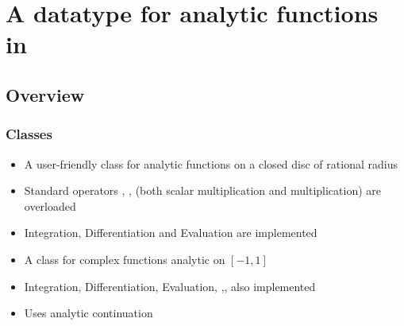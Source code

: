 \section[{Analytic functions in \irram}]{A datatype for analytic functions in \irram}
\subsection{Overview}
\begin{frame}[<+->]
\frametitle{Classes}
\begin{itemize}
\item A user-friendly class for analytic functions on a closed disc of rational radius
\item Standard operators \code{+}, \code{-}, \code{*} (both scalar multiplication and multiplication) are overloaded
\item Integration, Differentiation and Evaluation are implemented
\end{itemize}
\pause
{}
\begin{itemize}
\item A class for complex functions analytic on $[-1,1]$
\item Integration, Differentiation, Evaluation, \code{+},\code{-},  \code{*} also implemented  
\item Uses analytic continuation
\end{itemize}
\end{frame}
